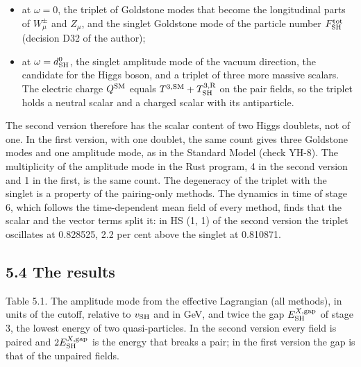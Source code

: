 \documentclass[
  10pt,
]{article}
\providecommand{\tightlist}{%
  \setlength{\itemsep}{0pt}\setlength{\parskip}{0pt}}
\begin{document}
\begin{itemize}
\tightlist
\item
  at \(\omega=0\), the triplet of Goldstone modes that become the
  longitudinal parts of \(W^\pm_\mu\) and \(Z_\mu\), and the singlet
  Goldstone mode of the particle number \(F^{\rm tot}_{\rm SH}\)
  (decision D32 of the author);
\item
  at \(\omega=d^0_{\rm SH}\), the singlet amplitude mode of the vacuum
  direction, the candidate for the Higgs boson, and a triplet of three
  more massive scalars. The electric charge \(Q^{\rm SM}\) equals
  \(T^{3,{\rm SM}}+T^{3,{\rm R}}_{\rm SH}\) on the pair fields, so the
  triplet holds a neutral scalar and a charged scalar with its
  antiparticle.
\end{itemize}

The second version therefore has the scalar content of two Higgs
doublets, not of one. In the first version, with one doublet, the same
count gives three Goldstone modes and one amplitude mode, as in the
Standard Model (check YH-8). The multiplicity of the amplitude mode in
the Rust program, 4 in the second version and 1 in the first, is the
same count. The degeneracy of the triplet with the singlet is a property
of the pairing-only methods. The dynamics in time of stage 6, which
follows the time-dependent mean field of every method, finds that the
scalar and the vector terms split it: in HS (1, 1) of the second version
the triplet oscillates at 0.828525, 2.2 per cent above the singlet at
0.810871.

\hypertarget{the-results-1}{%
\subsection{5.4 The results}\label{the-results-1}}

Table 5.1. The amplitude mode from the effective Lagrangian (all
methods), in units of the cutoff, relative to \(v_{\rm SH}\) and in GeV,
and twice the gap \(E^{X,{\rm gap}}_{\rm SH}\) of stage 3, the lowest
energy of two quasi-particles. In the second version every field is
paired and \(2E^{X,{\rm gap}}_{\rm SH}\) is the energy that breaks a
pair; in the first version the gap is that of the unpaired fields.
\end{document}

